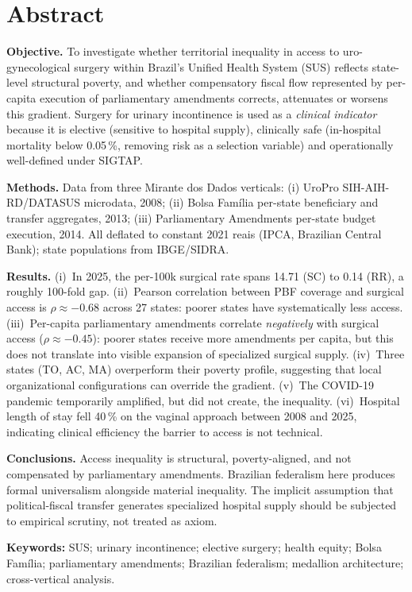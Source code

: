 \documentclass[12pt,a4paper,oneside]{article}
\begin{document}
\section*{Abstract}
\begin{singlespace}\small\noindent
\textbf{Objective.} To investigate whether territorial inequality
in access to uro-gynecological surgery within Brazil's Unified
Health System (SUS) reflects state-level structural poverty,
and whether compensatory fiscal flow \textemdash{} represented
by per-capita execution of parliamentary amendments \textemdash{}
corrects, attenuates or worsens this gradient. Surgery for
urinary incontinence is used as a \textit{clinical indicator}
because it is elective (sensitive to hospital supply), clinically
safe (in-hospital mortality below 0.05\,\%, removing risk as a
selection variable) and operationally well-defined under SIGTAP.

\textbf{Methods.} Data from three Mirante dos Dados verticals:
(i) UroPro \textemdash{} SIH-AIH-RD/DATASUS microdata,
2008; (ii) Bolsa Família \textemdash{} per-state
beneficiary and transfer aggregates, 2013;
(iii) Parliamentary Amendments \textemdash{} per-state budget
execution, 2014. All deflated to constant 2021
reais (IPCA, Brazilian Central Bank); state populations from
IBGE/SIDRA.

\textbf{Results.} (i)~In 2025, the per-100k surgical rate spans
14.71 (SC) to 0.14 (RR), a roughly 100-fold gap.
(ii)~Pearson correlation between PBF coverage and surgical
access is $\rho \approx -0.68$ across 27 states: poorer states
have systematically less access. (iii)~Per-capita parliamentary
amendments correlate \textit{negatively} with surgical access
($\rho \approx -0.45$): poorer states receive more amendments
per capita, but this does not translate into visible expansion
of specialized surgical supply. (iv)~Three states (TO, AC, MA)
overperform their poverty profile, suggesting that local
organizational configurations can override the gradient. (v)~The
COVID-19 pandemic temporarily amplified, but did not create, the
inequality. (vi)~Hospital length of stay fell 40\,\% on the
vaginal approach between 2008 and 2025, indicating clinical
efficiency \textemdash{} the barrier to access is not technical.

\textbf{Conclusions.} Access inequality is structural,
poverty-aligned, and not compensated by parliamentary
amendments. Brazilian federalism here produces formal
universalism alongside material inequality. The implicit
assumption that political-fiscal transfer generates specialized
hospital supply should be subjected to empirical scrutiny, not
treated as axiom.

\vspace{4pt}
\textbf{Keywords:} SUS; urinary incontinence; elective surgery;
health equity; Bolsa Família; parliamentary amendments; Brazilian
federalism; medallion architecture; cross-vertical analysis.
\end{singlespace}
\end{document}
